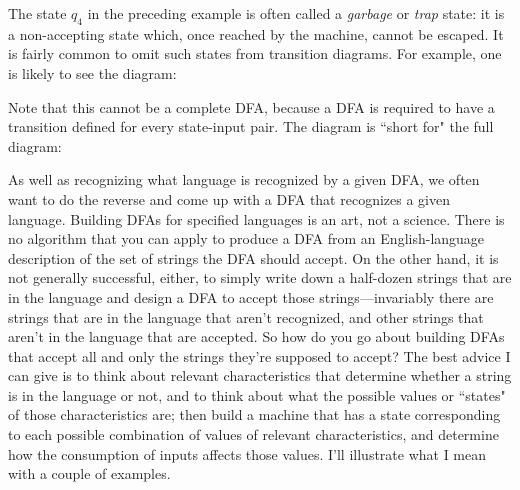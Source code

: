 The state $q_4$ in the preceding example is often called a {\em garbage} or {\em
trap} state: it is a non-accepting state which, once reached by the machine,
cannot be escaped.  It is fairly common to omit such states from transition
diagrams.  For example, one is likely to see the diagram:


Note that this cannot be a complete DFA, because a DFA is required to have a
transition defined for every state-input pair.  The diagram is ``short for" the
full diagram:



As well as recognizing what language is recognized by a given DFA, we often want to
do the reverse and come up with a DFA that recognizes a given language.
Building DFAs for specified languages is an art, not a science.
There is no algorithm that you can apply to produce a DFA from an English-language
description of the set of strings the DFA should accept.  On the other hand, it
is not generally successful, either, to simply write down a half-dozen strings
that are in the language and design a DFA to accept those strings---invariably
there are strings that are in the language that aren't recognized, and other
strings that aren't in the language that are accepted.  So how do you go about
building DFAs that accept all and only the strings they're supposed to accept?
The best advice I can give is to
think about relevant characteristics that determine whether a string is in the
language or not, and to think about what the possible values or ``states" of 
those characteristics
are; then build a machine that has a state corresponding to each possible
combination of values of relevant characteristics, and determine how the
consumption of inputs affects those values.  I'll illustrate what I mean with a
couple of examples.
